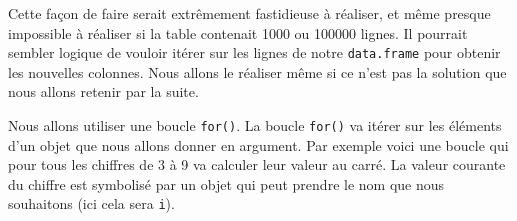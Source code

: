 \documentclass[]{book}
\newenvironment{Shaded}{\begin{snugshade}}{\end{snugshade}}
\newcommand{\CommentTok}[1]{\textcolor[rgb]{0.56,0.35,0.01}{\textit{#1}}}
\newcommand{\ControlFlowTok}[1]{\textcolor[rgb]{0.13,0.29,0.53}{\textbf{#1}}}
\newcommand{\DecValTok}[1]{\textcolor[rgb]{0.00,0.00,0.81}{#1}}
\newcommand{\NormalTok}[1]{#1}
\newcommand{\OperatorTok}[1]{\textcolor[rgb]{0.81,0.36,0.00}{\textbf{#1}}}
\newcommand{\StringTok}[1]{\textcolor[rgb]{0.31,0.60,0.02}{#1}}
\begin{document}
\begin{Shaded}
\end{Shaded}

Cette façon de faire serait extrêmement fastidieuse à réaliser, et même presque impossible à réaliser si la table contenait 1000 ou 100000 lignes. Il pourrait sembler logique de vouloir itérer sur les lignes de notre \texttt{data.frame} pour obtenir les nouvelles colonnes. Nous allons le réaliser même si ce n'est pas la solution que nous allons retenir par la suite.

Nous allons utiliser une boucle \texttt{for()}. La boucle \texttt{for()} va itérer sur les éléments d'un objet que nous allons donner en argument. Par exemple voici une boucle qui pour tous les chiffres de 3 à 9 va calculer leur valeur au carré. La valeur courante du chiffre est symbolisé par un objet qui peut prendre le nom que nous souhaitons (ici cela sera \texttt{i}).
\end{document}
